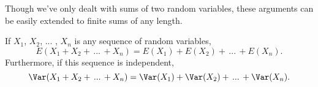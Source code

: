 Though we've only dealt with sums of two random variables, these arguments can be easily extended to finite sums of any length.

\begin{cor}\label{expectationandvarianceofindependentsum}If $X_1$, $X_2$, ... , $X_n$ is any sequence of random variables,
$$E(X_1 + X_2 + \, ... \, + X_n) = E(X_1) + E(X_2) + \, ... \, + E(X_n).$$
Furthermore, if this sequence is independent,
$$\Var(X_1 + X_2 + \, ... \, + X_n) = \Var(X_1) + \Var(X_2) + \, ... \, + \Var(X_n).$$
\end{cor}


